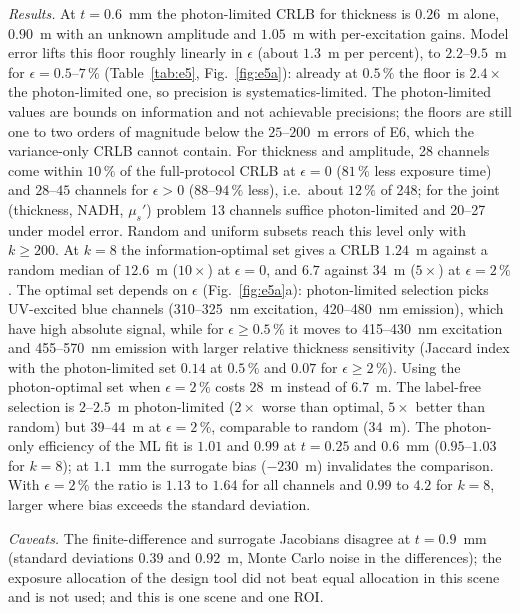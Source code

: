 \documentclass[journal]{IEEEtran}
\newcommand{\musp}{\mu_s'}
\begin{document}
\emph{Results.} At $t=0.6$~mm the photon-limited CRLB for thickness is $0.26$~\textmu m alone, $0.90$~\textmu m with an unknown amplitude and $1.05$~\textmu m with per-excitation gains. Model error lifts this floor roughly linearly in $\epsilon$ (about $1.3$~\textmu m per percent), to $2.2$--$9.5$~\textmu m for $\epsilon=0.5$--$7\,\%$ (Table~\ref{tab:e5}, Fig.~\ref{fig:e5a}): already at $0.5\,\%$ the floor is $2.4\times$ the photon-limited one, so precision is systematics-limited. The photon-limited values are bounds on information and not achievable precisions; the floors are still one to two orders of magnitude below the $25$--$200$~\textmu m errors of E6, which the variance-only CRLB cannot contain. For thickness and amplitude, 28 channels come within $10\,\%$ of the full-protocol CRLB at $\epsilon=0$ ($81\,\%$ less exposure time) and $28$--$45$ channels for $\epsilon>0$ ($88$--$94\,\%$ less), i.e.\ about $12\,\%$ of 248; for the joint (thickness, NADH, $\musp$) problem 13 channels suffice photon-limited and 20--27 under model error. Random and uniform subsets reach this level only with $k\ge200$. At $k=8$ the information-optimal set gives a CRLB $1.24$~\textmu m against a random median of $12.6$~\textmu m ($10\times$) at $\epsilon=0$, and $6.7$ against $34$~\textmu m ($5\times$) at $\epsilon=2\,\%$. The optimal set depends on $\epsilon$ (Fig.~\ref{fig:e5a}a): photon-limited selection picks UV-excited blue channels (310--325~nm excitation, 420--480~nm emission), which have high absolute signal, while for $\epsilon\ge0.5\,\%$ it moves to 415--430~nm excitation and 455--570~nm emission with larger relative thickness sensitivity (Jaccard index with the photon-limited set $0.14$ at $0.5\,\%$ and $0.07$ for $\epsilon\ge2\,\%$). Using the photon-optimal set when $\epsilon=2\,\%$ costs $28$~\textmu m instead of $6.7$~\textmu m. The label-free selection is $2$--$2.5$~\textmu m photon-limited ($2\times$ worse than optimal, $5\times$ better than random) but $39$--$44$~\textmu m at $\epsilon=2\,\%$, comparable to random ($34$~\textmu m). The photon-only efficiency of the ML fit is $1.01$ and $0.99$ at $t=0.25$ and $0.6$~mm ($0.95$--$1.03$ for $k=8$); at $1.1$~mm the surrogate bias ($-230$~\textmu m) invalidates the comparison. With $\epsilon=2\,\%$ the ratio is $1.13$ to $1.64$ for all channels and $0.99$ to $4.2$ for $k=8$, larger where bias exceeds the standard deviation.

\emph{Caveats.} The finite-difference and surrogate Jacobians disagree at $t=0.9$~mm (standard deviations $0.39$ and $0.92$~\textmu m, Monte Carlo noise in the differences); the exposure allocation of the design tool did not beat equal allocation in this scene and is not used; and this is one scene and one ROI.
\end{document}
